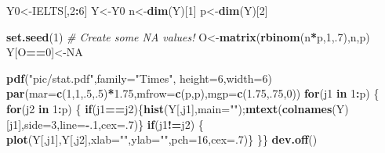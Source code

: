\documentclass[12pt]{article}
\newenvironment{Shaded}{\begin{snugshade}}{\end{snugshade}}
\newcommand{\AttributeTok}[1]{\textcolor[rgb]{0.13,0.29,0.53}{#1}}
\newcommand{\CommentTok}[1]{\textcolor[rgb]{0.56,0.35,0.01}{\textit{#1}}}
\newcommand{\ConstantTok}[1]{\textcolor[rgb]{0.56,0.35,0.01}{#1}}
\newcommand{\ControlFlowTok}[1]{\textcolor[rgb]{0.13,0.29,0.53}{\textbf{#1}}}
\newcommand{\DecValTok}[1]{\textcolor[rgb]{0.00,0.00,0.81}{#1}}
\newcommand{\FloatTok}[1]{\textcolor[rgb]{0.00,0.00,0.81}{#1}}
\newcommand{\FunctionTok}[1]{\textcolor[rgb]{0.13,0.29,0.53}{\textbf{#1}}}
\newcommand{\NormalTok}[1]{#1}
\newcommand{\OtherTok}[1]{\textcolor[rgb]{0.56,0.35,0.01}{#1}}
\newcommand{\SpecialCharTok}[1]{\textcolor[rgb]{0.81,0.36,0.00}{\textbf{#1}}}
\newcommand{\StringTok}[1]{\textcolor[rgb]{0.31,0.60,0.02}{#1}}
\begin{document}
\begin{Shaded}
\begin{Highlighting}[]
\NormalTok{Y0}\OtherTok{\textless{}{-}}\NormalTok{IELTS[,}\DecValTok{2}\SpecialCharTok{:}\DecValTok{6}\NormalTok{]}
\NormalTok{Y}\OtherTok{\textless{}{-}}\NormalTok{Y0}
\NormalTok{n}\OtherTok{\textless{}{-}}\FunctionTok{dim}\NormalTok{(Y)[}\DecValTok{1}\NormalTok{]}
\NormalTok{p}\OtherTok{\textless{}{-}}\FunctionTok{dim}\NormalTok{(Y)[}\DecValTok{2}\NormalTok{]}

\FunctionTok{set.seed}\NormalTok{(}\DecValTok{1}\NormalTok{)}
\CommentTok{\# Create some NA values!}
\NormalTok{O}\OtherTok{\textless{}{-}}\FunctionTok{matrix}\NormalTok{(}\FunctionTok{rbinom}\NormalTok{(n}\SpecialCharTok{*}\NormalTok{p,}\DecValTok{1}\NormalTok{,.}\DecValTok{7}\NormalTok{),n,p)}
\NormalTok{Y[O}\SpecialCharTok{==}\DecValTok{0}\NormalTok{]}\OtherTok{\textless{}{-}}\ConstantTok{NA}

\FunctionTok{pdf}\NormalTok{(}\StringTok{"pic/stat.pdf"}\NormalTok{,}\AttributeTok{family=}\StringTok{"Times"}\NormalTok{, }\AttributeTok{height=}\DecValTok{6}\NormalTok{,}\AttributeTok{width=}\DecValTok{6}\NormalTok{)}
\FunctionTok{par}\NormalTok{(}\AttributeTok{mar=}\FunctionTok{c}\NormalTok{(}\DecValTok{1}\NormalTok{,}\DecValTok{1}\NormalTok{,.}\DecValTok{5}\NormalTok{,.}\DecValTok{5}\NormalTok{)}\SpecialCharTok{*}\FloatTok{1.75}\NormalTok{,}\AttributeTok{mfrow=}\FunctionTok{c}\NormalTok{(p,p),}\AttributeTok{mgp=}\FunctionTok{c}\NormalTok{(}\FloatTok{1.75}\NormalTok{,.}\DecValTok{75}\NormalTok{,}\DecValTok{0}\NormalTok{))}
\ControlFlowTok{for}\NormalTok{(j1 }\ControlFlowTok{in} \DecValTok{1}\SpecialCharTok{:}\NormalTok{p) \{}
\ControlFlowTok{for}\NormalTok{(j2 }\ControlFlowTok{in} \DecValTok{1}\SpecialCharTok{:}\NormalTok{p) \{}
 \ControlFlowTok{if}\NormalTok{(j1}\SpecialCharTok{==}\NormalTok{j2)\{}\FunctionTok{hist}\NormalTok{(Y[,j1],}\AttributeTok{main=}\StringTok{""}\NormalTok{);}\FunctionTok{mtext}\NormalTok{(}\FunctionTok{colnames}\NormalTok{(Y)[j1],}\AttributeTok{side=}\DecValTok{3}\NormalTok{,}\AttributeTok{line=}\SpecialCharTok{{-}}\NormalTok{.}\DecValTok{1}\NormalTok{,}\AttributeTok{cex=}\NormalTok{.}\DecValTok{7}\NormalTok{)\}}
  \ControlFlowTok{if}\NormalTok{(j1}\SpecialCharTok{!=}\NormalTok{j2) \{ }\FunctionTok{plot}\NormalTok{(Y[,j1],Y[,j2],}\AttributeTok{xlab=}\StringTok{""}\NormalTok{,}\AttributeTok{ylab=}\StringTok{""}\NormalTok{,}\AttributeTok{pch=}\DecValTok{16}\NormalTok{,}\AttributeTok{cex=}\NormalTok{.}\DecValTok{7}\NormalTok{)\} }
\NormalTok{                \}\}}
\FunctionTok{dev.off}\NormalTok{()}
\end{Highlighting}
\end{Shaded}
\end{document}
